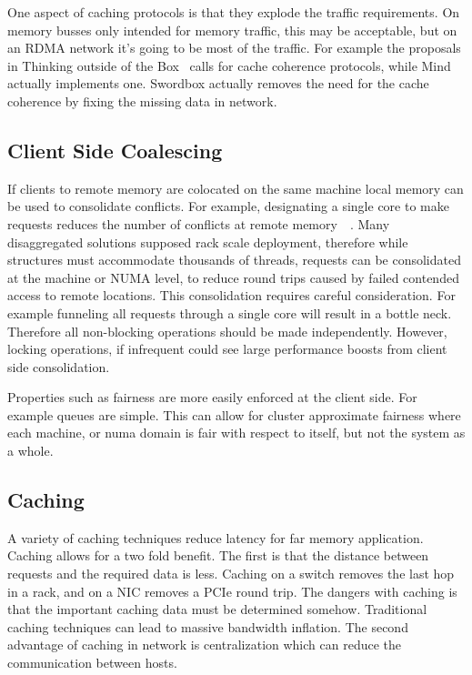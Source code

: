 One aspect of caching protocols is that they explode the traffic requirements.
On memory busses only intended for memory traffic, this may be acceptable, but
on an RDMA network it's going to be most of the traffic. For example the
proposals in Thinking outside of the Box~\cite{design-far-memory-struct} calls
for cache coherence protocols, while Mind~\cite{mind} actually implements one.
Swordbox actually removes the need for the cache coherence by fixing the missing
data in network.

\subsection{Client Side Coalescing}

If clients to remote memory are colocated on the same machine local memory can
be used to consolidate conflicts. For example, designating a single core to make
requests reduces the number of conflicts at remote
memory~\cite{flat-combine}~\cite{sherman}. Many disaggregated solutions supposed
rack scale deployment, therefore while structures must accommodate thousands of
threads, requests can be consolidated at the machine or NUMA level, to reduce
round trips caused by failed contended access to remote locations. This
consolidation requires careful consideration. For example funneling all requests
through a single core will result in a bottle neck. Therefore all non-blocking
operations should be made independently. However, locking operations, if
infrequent could see large performance boosts from client side consolidation.

Properties such as fairness are more easily enforced at the client side. For
example queues are simple. This can allow for cluster approximate fairness where
each machine, or numa domain is fair with respect to itself, but not the system
as a whole.

\subsection{Caching} A variety of caching techniques reduce latency for far memory
application. Caching allows for a two fold benefit. The first is that the
distance between requests and the required data is less. Caching on a switch
removes the last hop in a rack, and on a NIC removes a PCIe round trip. The
dangers with caching is that the important caching data must be determined
somehow. Traditional caching techniques can lead to massive bandwidth inflation.
The second advantage of caching in network is centralization which can reduce
the communication between hosts.


